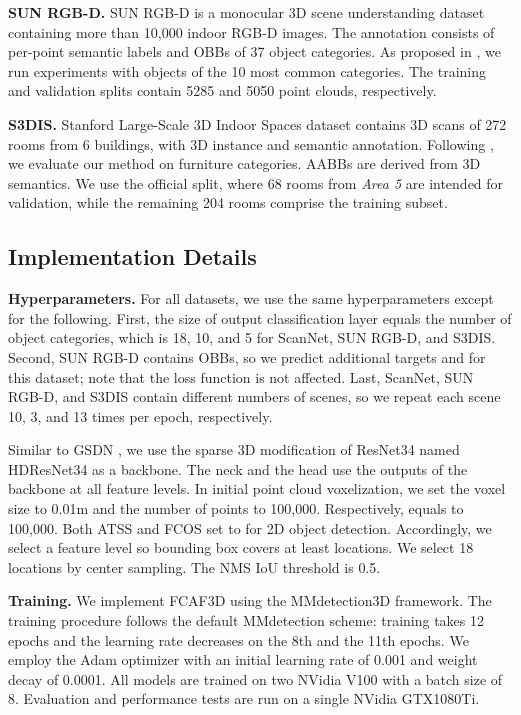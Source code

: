 \documentclass[runningheads]{llncs}
\begin{document}
\textbf{SUN RGB-D.} SUN RGB-D is a monocular 3D scene understanding dataset containing more than 10,000 indoor RGB-D images. The annotation consists of per-point semantic labels and OBBs of 37 object categories. As proposed in \cite{qi2019votenet}, we run experiments with objects of the 10 most common categories. The training and validation splits contain 5285 and 5050 point clouds, respectively.

\textbf{S3DIS.} Stanford Large-Scale 3D Indoor Spaces dataset contains 3D scans of 272 rooms from 6 buildings, with 3D instance and semantic annotation. Following \cite{gwak2020gsdn}, we evaluate our method on furniture categories. AABBs are derived from 3D semantics. We use the official split, where 68 rooms from \textit{Area 5} are intended for validation, while the remaining 204 rooms comprise the training subset.

\subsection{Implementation Details}

\textbf{Hyperparameters.} For all datasets, we use the same hyperparameters except for the following. First, the size of output classification layer equals the number of object categories, which is 18, 10, and 5 for ScanNet, SUN RGB-D, and S3DIS. Second, SUN RGB-D contains OBBs, so we predict additional targets  and  for this dataset; note that the loss function is not affected. Last, ScanNet, SUN RGB-D, and S3DIS contain different numbers of scenes, so we repeat each scene 10, 3, and 13 times per epoch, respectively. 

Similar to GSDN \cite{gwak2020gsdn}, we use the sparse 3D modification of ResNet34 named HDResNet34 as a backbone. The neck and the head use the outputs of the backbone at all feature levels. In initial point cloud voxelization, we set the voxel size to 0.01m and the number of points  to 100,000. Respectively,  equals to 100,000. Both ATSS \cite{zhang2020atss} and FCOS \cite{tian2019fcos} set  to  for 2D object detection. Accordingly, we select a feature level so bounding box covers at least  locations. We select 18 locations by center sampling. The NMS IoU threshold is 0.5.

\textbf{Training.} We implement FCAF3D using the MMdetection3D \cite{2020mmdetection3d} framework. The training procedure follows the default MMdetection \cite{chen2019mmdetection} scheme: training takes 12 epochs and the learning rate decreases on the 8th and the 11th epochs. We employ the Adam optimizer with an initial learning rate of 0.001 and weight decay of 0.0001. All models are trained on two NVidia V100 with a batch size of 8. Evaluation and performance tests are run on a single NVidia GTX1080Ti.
\end{document}
